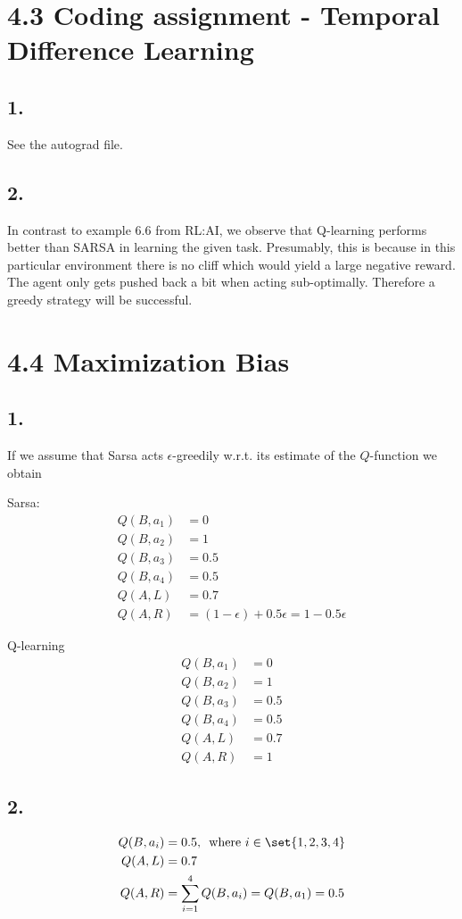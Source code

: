 \documentclass{article}
\begin{document}
\section*{4.3 Coding assignment - Temporal Difference Learning}
\subsection*{1.}
See the autograd file.

\subsection*{2.}
In contrast to example 6.6 from RL:AI, we observe that Q-learning performs better than SARSA in learning the given task. Presumably, this is because in this particular environment there is no cliff which would yield a large negative reward. The agent only gets pushed back a bit when acting sub-optimally. Therefore a greedy strategy will be successful.

\section*{4.4 Maximization Bias}
\subsection*{1.}

If we assume that Sarsa acts $\epsilon$-greedily w.r.t. its estimate of the $Q$-function we obtain

Sarsa:
\begin{align*}
Q(B, a_1) &= 0\\
Q(B, a_2) &= 1\\
Q(B, a_3) &= 0.5\\
Q(B, a_4) &= 0.5\\
Q(A, L) &=  0.7\\
Q(A, R) &=  (1-\epsilon) + 0.5\epsilon = 1-0.5\epsilon
\end{align*}

Q-learning
\begin{align*}
Q(B, a_1) &= 0\\
Q(B, a_2) &= 1\\
Q(B, a_3) &= 0.5\\
Q(B, a_4) &= 0.5\\
Q(A, L) &=  0.7\\
Q(A, R) &=  1
\end{align*}



\subsection*{2.}
\begin{align*}
Q(B, a_i) &= 0.5 ,\, \text{ where  }i\in\set{1,2,3,4}\\
Q(A, L) &= 0.7\\
Q(A, R) &= \sum_{i=1}^4 Q(B,a_i) = Q(B,a_1) = 0.5
\end{align*}
\end{document}
